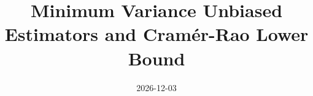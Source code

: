 \documentclass[a4paper,oneside,10pt,ngerman,english]{scrartcl}
\begin{document}
\title{Minimum Variance Unbiased Estimators and Cramér-Rao Lower Bound}
\date{2026-12-03}
\maketitle






\appendix

\end{document}
